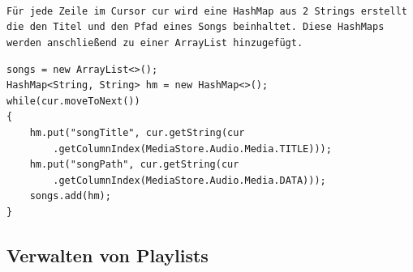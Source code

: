 \documentclass[FIPLY_base.tex]{subfiles}
\begin{document}
\newpage
\ \\
\texttt{Für jede Zeile im Cursor cur wird eine HashMap aus 2 Strings erstellt die den Titel und den Pfad eines Songs beinhaltet. Diese HashMaps werden anschließend zu einer ArrayList hinzugefügt.}
\begin{lstlisting}
songs = new ArrayList<>();
HashMap<String, String> hm = new HashMap<>();
while(cur.moveToNext())
{
	hm.put("songTitle", cur.getString(cur
		.getColumnIndex(MediaStore.Audio.Media.TITLE)));
	hm.put("songPath", cur.getString(cur
		.getColumnIndex(MediaStore.Audio.Media.DATA)));
	songs.add(hm);
}
\end{lstlisting}




\subsection {Verwalten von Playlists}
\end{document}
